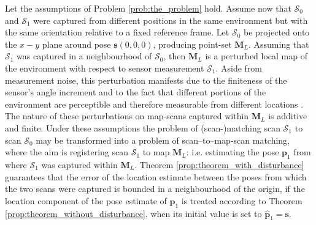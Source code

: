 Let the assumptions of Problem \ref{prob:the_problem} hold. Assume now
that $\mathcal{S}_0$ and $\mathcal{S}_1$ were captured from different
positions in the same environment but with the same orientation
relative to a fixed reference frame. Let $\mathcal{S}_0$ be projected onto
the $x-y$ plane around pose $\bm{s}(0,0,0)$,
producing point-set $\bm{M}_L$. Assuming that $\mathcal{S}_1$ was captured in a
neighbourhood of $\mathcal{S}_0$, then $\bm{M}_L$ is a perturbed local map of
the environment with respect to sensor measurement $\mathcal{S}_1$. Aside from
measurement noise, this perturbation manifests due to the finiteness of the
sensor's angle increment and to the fact that different portions of the
environment are perceptible and therefore measurable from different locations
\cite{olson}. The nature of these perturbations on map-scans captured within
$\bm{M}_L$ is additive and finite. Under these assumptions the problem of
(scan-)matching scan $\mathcal{S}_1$ to scan $\mathcal{S}_0$ may be transformed
into a problem of scan--to--map-scan matching, where the aim is registering
scan $\mathcal{S}_1$ to map $\bm{M}_L$: i.e. estimating the pose $\bm{p}_1$
from where $\mathcal{S}_1$ was captured within $\bm{M}_L$. Theorem
\ref{prop:theorem_with_disturbance} guarantees that the error of the location
estimate between the poses from which the two scans were captured is bounded in
a neighbourhood of the origin, if the location component of the pose estimate
of $\bm{p}_1$ is treated according to Theorem
\ref{prop:theorem_without_disturbance}, when its initial value is set to
$\hat{\bm{p}}_1 = \bm{s}$.


